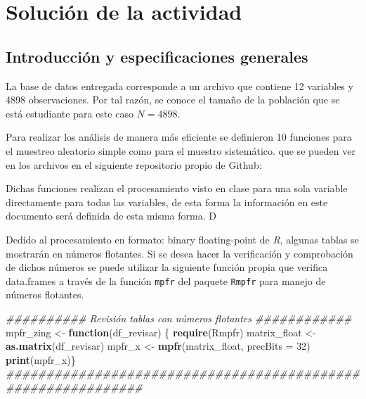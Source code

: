 \documentclass[
]{article}
\newenvironment{Shaded}{\begin{snugshade}}{\end{snugshade}}
\newcommand{\CommentTok}[1]{\textcolor[rgb]{0.56,0.35,0.01}{\textit{#1}}}
\newcommand{\ControlFlowTok}[1]{\textcolor[rgb]{0.13,0.29,0.53}{\textbf{#1}}}
\newcommand{\DataTypeTok}[1]{\textcolor[rgb]{0.13,0.29,0.53}{#1}}
\newcommand{\DecValTok}[1]{\textcolor[rgb]{0.00,0.00,0.81}{#1}}
\newcommand{\KeywordTok}[1]{\textcolor[rgb]{0.13,0.29,0.53}{\textbf{#1}}}
\newcommand{\NormalTok}[1]{#1}
\newcommand{\StringTok}[1]{\textcolor[rgb]{0.31,0.60,0.02}{#1}}
\begin{document}
\hypertarget{soluciuxf3n-de-la-actividad}{%
\section{Solución de la actividad}\label{soluciuxf3n-de-la-actividad}}

\hypertarget{introducciuxf3n-y-especificaciones-generales}{%
\subsection{Introducción y especificaciones
generales}\label{introducciuxf3n-y-especificaciones-generales}}

La base de datos entregada corresponde a un archivo que contiene 12
variables y 4898 observaciones. Por tal razón, se conoce el tamaño de la
población que se está estudiante para este caso \(N = 4898\).

Para realizar los análisis de manera más eficiente se definieron 10
funciones para el muestreo aleatorio simple como para el muestro
sistemático. que se pueden ver en los archivos en el siguiente
repositorio propio de Github:

Dichas funciones realizan el procesamiento visto en clase para una sola
variable directamente para todas las variables, de esta forma la
información en este documento será definida de esta misma forma. D

Dedido al procesamiento en formato: binary floating-point de \emph{R},
algunas tablas se mostrarán en números flotantes. Si se desea hacer la
verificación y comprobación de dichos números se puede utilizar la
siguiente función propia que verifica data.frames a través de la función
\texttt{mpfr} del paquete \texttt{Rmpfr} para manejo de números
flotantes.

\begin{Shaded}
\begin{Highlighting}[]
\CommentTok{########## Revisión tablas con números flotantes ############}
\NormalTok{mpfr_zing <-}\StringTok{ }\ControlFlowTok{function}\NormalTok{(df_revisar) \{}
    \KeywordTok{require}\NormalTok{(Rmpfr)}
\NormalTok{    matrix_float <-}\StringTok{ }\KeywordTok{as.matrix}\NormalTok{(df_revisar)}
\NormalTok{    mpfr_x <-}\StringTok{ }\KeywordTok{mpfr}\NormalTok{(matrix_float, }\DataTypeTok{precBits =} \DecValTok{32}\NormalTok{)}
    \KeywordTok{print}\NormalTok{(mpfr_x)\}}
\CommentTok{#############################################################}
\end{Highlighting}
\end{Shaded}
\end{document}
